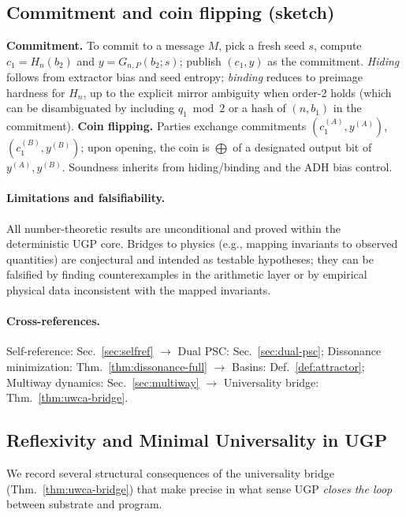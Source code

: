 \documentclass[12pt]{article}
\numberwithin{equation}{section}
\begin{document}
\subsection{Commitment and coin flipping (sketch)}\label{subsec:commit}
\textbf{Commitment.} To commit to a message $M$, pick a fresh seed $s$, compute $c_1=H_n(b_2)$ and $y=G_{n,P}(b_2;s)$; publish $(c_1,y)$ as the commitment. \emph{Hiding} follows from extractor bias and seed entropy; \emph{binding} reduces to preimage hardness for $H_n$, up to the explicit mirror ambiguity when order-2 holds (which can be disambiguated by including $q_1\bmod 2$ or a hash of $(n,b_1)$ in the commitment). \textbf{Coin flipping.} Parties exchange commitments $(c_1^{(A)},y^{(A)})$, $(c_1^{(B)},y^{(B)})$; upon opening, the coin is $\bigoplus$ of a designated output bit of $y^{(A)},y^{(B)}$. Soundness inherits from hiding/binding and the ADH bias control.

\paragraph{Limitations and falsifiability.}
All number-theoretic results are unconditional and proved within the deterministic UGP core.  
Bridges to physics (e.g., mapping invariants to observed quantities) are conjectural and intended as testable hypotheses; they can be falsified by finding counterexamples in the arithmetic layer or by empirical physical data inconsistent with the mapped invariants.

\paragraph{Cross-references.}
Self-reference: Sec.~\ref{sec:selfref} \(\rightarrow\) Dual PSC: Sec.~\ref{sec:dual-psc};
Dissonance minimization: Thm.~\ref{thm:dissonance-full} \(\rightarrow\) Basins: Def.~\ref{def:attractor};
Multiway dynamics: Sec.~\ref{sec:multiway} \(\rightarrow\) Universality bridge: Thm.~\ref{thm:uwca-bridge}.

\subsection{Reflexivity and Minimal Universality in UGP}\label{subsec:reflexive-univ}

We record several structural consequences of the universality bridge (Thm.~\ref{thm:uwca-bridge}) that make precise in what sense UGP \emph{closes the loop} between substrate and program.
\end{document}
